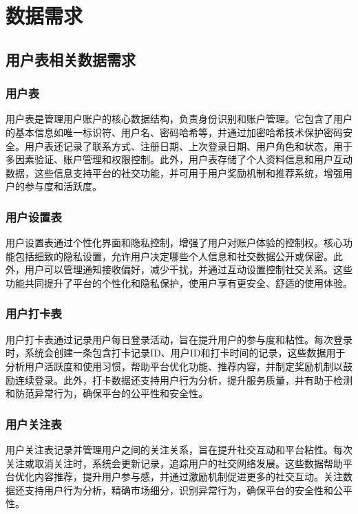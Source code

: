 \section{数据需求}\label{sec:Data_Requirements}

\subsection{用户表相关数据需求}

\subsubsection{用户表}

用户表是管理用户账户的核心数据结构，负责身份识别和账户管理。它包含了用户的基本信息如唯一标识符、用户名、密码哈希等，并通过加密哈希技术保护密码安全。用户表还记录了联系方式、注册日期、上次登录日期、用户角色和状态，用于多因素验证、账户管理和权限控制。此外，用户表存储了个人资料信息和用户互动数据，这些信息支持平台的社交功能，并可用于用户奖励机制和推荐系统，增强用户的参与度和活跃度。

\subsubsection{用户设置表}

用户设置表通过个性化界面和隐私控制，增强了用户对账户体验的控制权。核心功能包括细致的隐私设置，允许用户决定哪些个人信息和社交数据公开或保密。此外，用户可以管理通知接收偏好，减少干扰，并通过互动设置控制社交关系。这些功能共同提升了平台的个性化和隐私保护，使用户享有更安全、舒适的使用体验。

\subsubsection{用户打卡表}

用户打卡表通过记录用户每日登录活动，旨在提升用户的参与度和粘性。每次登录时，系统会创建一条包含打卡记录ID、用户ID和打卡时间的记录，这些数据用于分析用户活跃度和使用习惯，帮助平台优化功能、推荐内容，并制定奖励机制以鼓励连续登录。此外，打卡数据还支持用户行为分析，提升服务质量，并有助于检测和防范异常行为，确保平台的公平性和安全性。

\subsubsection{用户关注表}

用户关注表记录并管理用户之间的关注关系，旨在提升社交互动和平台粘性。每次关注或取消关注时，系统会更新记录，追踪用户的社交网络发展。这些数据帮助平台优化内容推荐，提升用户参与感，并通过激励机制促进更多的社交互动。关注数据还支持用户行为分析，精确市场细分，识别异常行为，确保平台的安全性和公平性。

